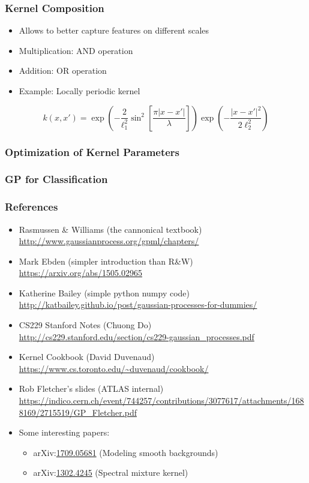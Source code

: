 \begin{frame} \frametitle{Kernel Composition}
\begin{itemize}
  \item Allows to better capture features on different scales
  \item Multiplication: AND operation
  \item Addition: OR operation
  \item Example: Locally periodic kernel
\end{itemize}
\begin{equation}
  k(x,x') =
  \exp\left(-\frac{2}{\ell_1^2}\sin^2\left[\frac{\pi|x - x'|}{\lambda}\right]\right)
  \exp\left(-\frac{\left|x-x'\right|^2}{2\ell_2^2}\right)
\end{equation}
\end{frame}

\begin{frame} \frametitle{Optimization of Kernel Parameters}
\end{frame}

\begin{frame} \frametitle{GP for Classification}
\end{frame}

\newcommand{\R}[2]{\item #1 \\ {\scriptsize\url{#2}}}
\newcommand{\arxiv}[1]{arXiv:\href{https://arxiv.org/abs/#1}{#1}}

\begin{frame} \frametitle{References}
\begin{itemize}
  \R{Rasmussen \& Williams (the cannonical textbook)}
    {http://www.gaussianprocess.org/gpml/chapters/}
  \R{Mark Ebden {\small(simpler introduction than R\&W)}}
    {https://arxiv.org/abs/1505.02965}
  \R{Katherine Bailey {\small(simple python\,\plus\,numpy code)}}
    {http://katbailey.github.io/post/gaussian-processes-for-dummies/}
  \R{CS229 Stanford Notes (Chuong Do)}
    {http://cs229.stanford.edu/section/cs229-gaussian_processes.pdf}
  \R{Kernel Cookbook (David Duvenaud)}
    {https://www.cs.toronto.edu/~duvenaud/cookbook/}
  \R{Rob Fletcher's slides (ATLAS internal)}
    {https://indico.cern.ch/event/744257/contributions/3077617/attachments/1688169/2715519/GP_Fletcher.pdf}
  \item Some interesting papers:
  \begin{itemize}
    \item \arxiv{1709.05681} (Modeling smooth backgrounds)
    \item \arxiv{1302.4245} (Spectral mixture kernel)
  \end{itemize}
\end{itemize}
\end{frame}

